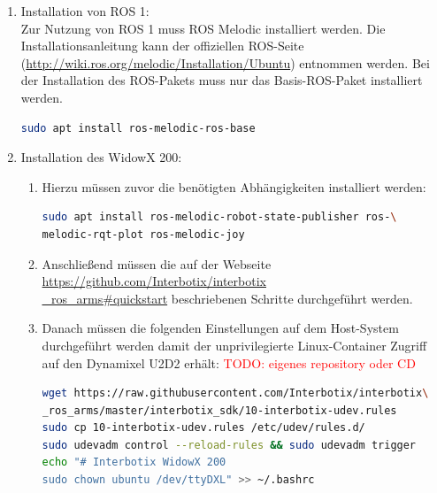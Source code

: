 \begin{enumerate}[label*=\arabic*.]
    \item Installation von ROS 1:\\
    Zur Nutzung von ROS 1 muss ROS Melodic installiert werden. Die Installationsanleitung kann der offiziellen ROS-Seite (\href{http://wiki.ros.org/melodic/Installation/Ubuntu}{http://wiki.ros.org/melodic/Installation/Ubuntu}) entnommen werden. Bei der Installation des ROS-Pakets muss nur das Basis-ROS-Paket installiert werden.

        \begin{lstlisting}[language=bash]
sudo apt install ros-melodic-ros-base
        \end{lstlisting}

    \item Installation des WidowX 200:
        \begin{enumerate}[label*=\arabic*.]
            \item Hierzu müssen zuvor die benötigten Abhängigkeiten installiert werden:

                \begin{lstlisting}[language=bash]
sudo apt install ros-melodic-robot-state-publisher ros-\
melodic-rqt-plot ros-melodic-joy
                \end{lstlisting}

            \item Anschließend müssen die auf der Webseite \href{https://github.com/Interbotix/interbotix_ros_arms#quickstart}{https://github.com/Interbotix/interbotix\\\_ros\_arms\#quickstart} beschriebenen Schritte durchgeführt werden.

            \item Danach müssen die folgenden Einstellungen auf dem Host-System durchgeführt werden damit der unprivilegierte Linux-Container Zugriff auf den Dynamixel U2D2 erhält: \textcolor{red}{\newline\newline TODO: eigenes repository oder CD\newline\newline}

                \begin{lstlisting}[language=bash]
wget https://raw.githubusercontent.com/Interbotix/interbotix\
_ros_arms/master/interbotix_sdk/10-interbotix-udev.rules
sudo cp 10-interbotix-udev.rules /etc/udev/rules.d/
sudo udevadm control --reload-rules && sudo udevadm trigger
echo "# Interbotix WidowX 200
sudo chown ubuntu /dev/ttyDXL" >> ~/.bashrc
                \end{lstlisting}


\end{enumerate}
\end{enumerate}
